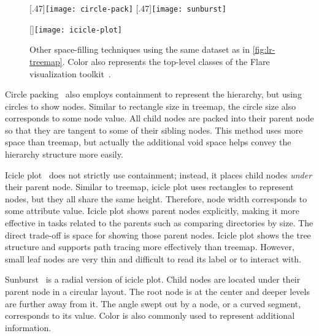 \begin{figure}[!htb]
	\centering
	[.47\columnwidth]{\texttt{[image: circle-pack]}}
	\hfill
	[.47\columnwidth]{\texttt{[image: sunburst]}}
	
	\vspace{.5\baselineskip}
	
	[\columnwidth]{\texttt{[image: icicle-plot]}}
	\caption[Other space-filling techniques]{Other space-filling techniques using the same dataset as in \autoref{fig:lr-treemap}. Color also represents the top-level classes of the Flare visualization toolkit~\cite{Heer2009b}.}
	\label{fig:lr-other-space-filling}
\end{figure}

Circle packing~\cite{Wang2006} also employs containment to represent the hierarchy, but using circles to show nodes. Similar to rectangle size in treemap, the circle size also corresponds to some node value. All child nodes are packed into their parent node so that they are tangent to some of their sibling nodes. This method uses more space than treemap, but actually the additional void space helps convey the hierarchy structure more easily.

Icicle plot~\cite{Kruskal1983} does not strictly use containment; instead, it places child nodes \emph{under} their parent node. Similar to treemap, icicle plot uses rectangles to represent nodes, but they all share the same height. Therefore, node width corresponds to some attribute value. Icicle plot shows parent nodes explicitly, making it more effective in tasks related to the parents such as comparing directories by size. The direct trade-off is space for showing those parent nodes. Icicle plot shows the tree structure and supports path tracing more effectively than treemap. However, small leaf nodes are very thin and difficult to read its label or to interact with.

Sunburst~\cite{Zhang2000} is a radial version of icicle plot. Child nodes are located under their parent node in a circular layout. The root node is at the center and deeper levels are further away from it. The angle swept out by a node, or a curved segment, corresponds to its value. Color is also commonly used to represent additional information.

